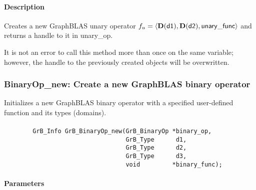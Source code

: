 \paragraph{Description}

Creates a new GraphBLAS unary operator $f_u = \langle \bold{D}({\sf d1}), 
\bold{D}({\sf d2}), {\sf unary\_func} \rangle$ and returns a handle to it 
in {\sf unary\_op}.

It is not an error to call this method more than once on the same variable;  
however, the handle to the previously created objects will be overwritten. 


\subsubsection{{\sf BinaryOp\_new}: Create a new GraphBLAS binary operator}

Initializes a new GraphBLAS binary operator with a specified user-defined 
function and its types (domains).

\paragraph{\syntax}

\begin{verbatim}
        GrB_Info GrB_BinaryOp_new(GrB_BinaryOp *binary_op,
                                  GrB_Type      d1,
                                  GrB_Type      d2,
                                  GrB_Type      d3,
                                  void         *binary_func);
\end{verbatim}

\paragraph{Parameters}

